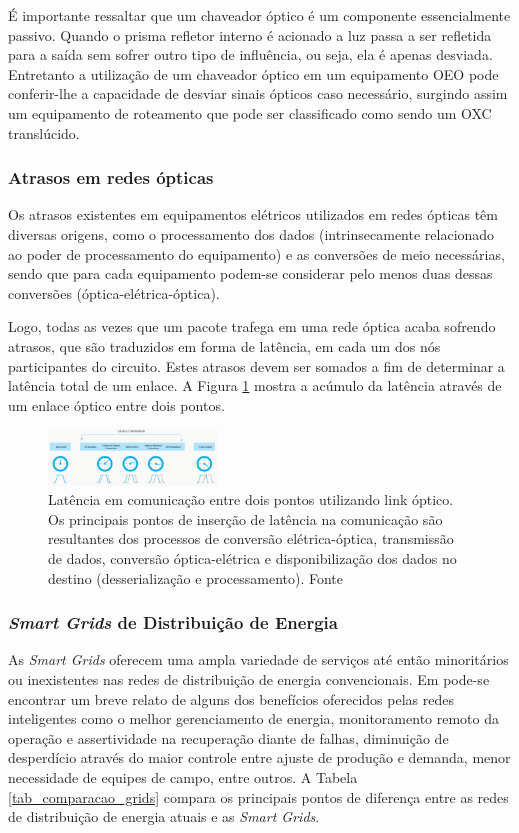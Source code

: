 \documentclass[conference]{IEEEtran}
\begin{document}
É importante ressaltar que um chaveador óptico é um componente essencialmente passivo. Quando o prisma refletor interno é acionado a luz passa a ser refletida para a saída sem sofrer outro tipo de influência, ou seja, ela é apenas desviada. Entretanto a utilização de um chaveador óptico em um equipamento OEO pode conferir-lhe a capacidade de desviar sinais ópticos caso necessário, surgindo assim um equipamento de roteamento que pode ser classificado como sendo um OXC translúcido. 

\subsubsection{Atrasos em redes ópticas}
Os atrasos existentes em equipamentos elétricos utilizados em redes ópticas têm diversas origens, como o processamento dos dados (intrinsecamente relacionado ao poder de processamento do equipamento) e as conversões de meio necessárias, sendo que para cada equipamento podem-se considerar pelo menos duas dessas conversões (óptica-elétrica-óptica). 

Logo, todas as vezes que um pacote trafega em uma rede óptica acaba sofrendo atrasos, que são traduzidos em forma de latência, em cada um dos nós participantes do circuito. Estes atrasos devem ser somados a fim de determinar a latência total de um enlace. A Figura \ref{fig_latency_link} mostra a acúmulo da latência através de um enlace óptico entre dois pontos. 

\begin{figure} [htbp]%
	\centering
	\includegraphics[width=0.4\textwidth]{./figuras/latency-link.png}
	\caption[Latência de Link]{Latência em comunicação entre dois pontos utilizando link óptico. Os principais pontos de inserção de latência na comunicação são resultantes dos processos de conversão elétrica-óptica, transmissão de dados, conversão óptica-elétrica e disponibilização dos dados no destino (desserialização e processamento). Fonte \cite{Art-Coffe2017}}
	\label{fig_latency_link}
\end{figure}

\subsubsection{\emph{Smart Grids} de Distribuição de Energia}
As \emph{Smart Grids} oferecem uma ampla variedade de serviços até então minoritários ou inexistentes nas redes de distribuição de energia convencionais. Em \cite{Art-Ma2013} pode-se encontrar um breve relato de alguns dos benefícios oferecidos pelas redes inteligentes como o melhor gerenciamento de energia, monitoramento remoto da operação e assertividade na recuperação diante de falhas, diminuição de desperdício através do maior controle entre ajuste de produção e demanda, menor necessidade de equipes de campo, entre outros. A Tabela \ref{tab_comparacao_grids} compara os principais pontos de diferença entre as redes de distribuição de energia atuais e as \emph{Smart Grids}.
\end{document}
